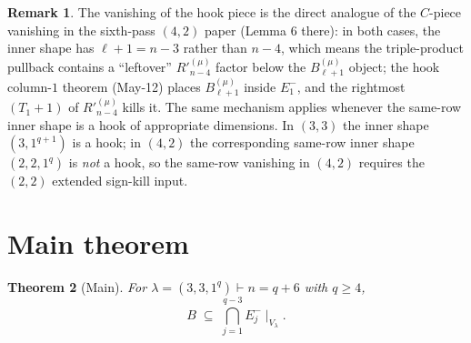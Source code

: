 \documentclass[11pt]{article}
\newtheorem{theorem}{Theorem}
\theoremstyle{definition}
\newtheorem{remark}[theorem]{Remark}
\newcommand{\Rp}{{R'}}
\begin{document}
\begin{remark}\label{rem:c-analog}
The vanishing of the hook piece is the direct analogue of the
$C$-piece vanishing in the sixth-pass $(4, 2)$ paper (Lemma 6 there):
in both cases, the inner shape has $\ell + 1 = n - 3$ rather than $n - 4$,
which means the triple-product pullback contains a ``leftover''
$\Rp^{(\mu)}_{n-4}$ factor below the $B^{(\mu)}_{\ell+1}$ object; the
hook column-$1$ theorem (May-12) places $B^{(\mu)}_{\ell+1}$ inside
$E_1^-$, and the rightmost $(T_1+1)$ of $\Rp^{(\mu)}_{n-4}$ kills it.
The same mechanism applies whenever the same-row inner shape is a hook
of appropriate dimensions.  In $(3, 3)$ the inner shape $(3, 1^{q+1})$
is a hook; in $(4, 2)$ the corresponding same-row inner shape
$(2, 2, 1^q)$ is \emph{not} a hook, so the same-row vanishing in
$(4, 2)$ requires the $(2, 2)$ extended sign-kill input.
\end{remark}

\section{Main theorem}\label{sec:main}

\begin{theorem}[Main]\label{thm:main}
For $\lambda = (3, 3, 1^q) \vdash n = q + 6$ with $q \ge 4$,
\[
   B \;\subseteq\; \bigcap_{j=1}^{q-3} E_j^-\!\mid_{V_\lambda}.
\]
\end{theorem}
\end{document}
